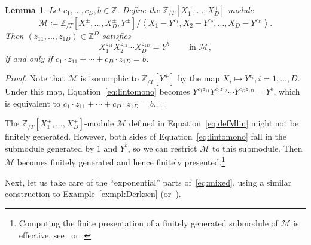 \documentclass[letterpaper, 11pt, thm-restate]{article}
\numberwithin{equation}{section}
\newcommand{\Z}{\mathbb{Z}}
\newcommand{\ZT}{\mathbb{Z}_{/T}}
\newcommand{\mM}{\mathcal{M}}
\newcommand{\gen}[1]{\left\langle {#1} \right\rangle}
\newtheorem{lem}[thrm]{Lemma}
\theoremstyle{definition}
\theoremstyle{definition}
\theoremstyle{definition}
\begin{document}
\begin{lem}\label{lem:linear}
    Let $c_1, \ldots, c_D, b \in \Z$. 
    Define the $\ZT[X_1^{\pm}, \ldots, X_D^{\pm}]$-module
    \begin{equation}\label{eq:defMlin}
        \mM \coloneqq \ZT[X_1^{\pm}, \ldots, X_D^{\pm}, Y^{\pm}]/\gen{X_1 - Y^{c_1}, X_2 - Y^{c_2}, \ldots, X_D - Y^{c_D}}.
    \end{equation}
    Then $(z_{11}, \ldots, z_{1D}) \in \Z^D$ satisfies 
    \begin{equation}\label{eq:lintomono}
        X_1^{z_{11}} X_2^{z_{12}} \cdots X_D^{z_{1D}} = Y^b \qquad \text{ in } \mM,
    \end{equation}
    if and only if $c_1 \cdot z_{11} + \cdots + c_D \cdot z_{1D} = b$.
\end{lem}
\begin{proof}
    Note that $\mM$ is isomorphic to $\ZT[Y^{\pm}]$ by the map $X_i \mapsto Y^{c_i}, i = 1, \ldots, D$.
    Under this map, Equation~\eqref{eq:lintomono} becomes $Y^{c_1z_{11}} Y^{c_2z_{12}} \cdots Y^{c_D z_{1D}} = Y^b$, which is equivalent to $c_1 \cdot z_{11} + \cdots + c_D \cdot z_{1D} = b$.
\end{proof}

The $\ZT[X_1^{\pm}, \ldots, X_D^{\pm}]$-module $\mM$ defined in Equation~\eqref{eq:defMlin} might not be finitely generated.
However, both sides of Equation~\eqref{eq:lintomono} fall in the submodule generated by $1$ and $Y^b$, so we can restrict $\mM$ to this submodule.
Then $\mM$ becomes finitely generated and hence finitely presented.\footnote{Computing the finite presentation of a finitely generated submodule of $\mM$ is effective, see~\cite[Theorem~2.14]{baumslag1981computable} or \cite[Theorem~2.6]{baumslag1994algorithmic}.} 

Next, let us take care of the ``exponential'' parts of~\eqref{eq:mixed}, using a similar construction to Example~\ref{exmpl:Derksen} (or~\cite[Example~1.3]{derksen2007skolem}).
\end{document}
